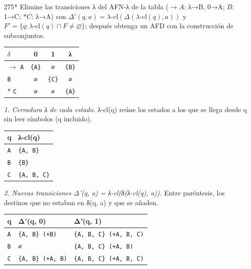 \documentclass[11pt]{article}
\begin{document}
\begin{ejercicio}{275}{*}
Elimine las transiciones λ del AFN-λ de la tabla ($\to A$: λ→{B}, 0→{A}; $B$: 1→{C}; $*C$: λ→{A}) con $\Delta'(q, a) = \lambda\text{-cl}(\Delta(\lambda\text{-cl}(q), a))$ y $F' = \{q : \lambda\text{-cl}(q) \cap F \ne \varnothing\}$; después obtenga un AFD con la construcción de subconjuntos.
\end{ejercicio}
\proc \begin{center}\small\begin{tabular}{lccc}\toprule
$\delta$ & 0 & 1 & λ \\\midrule
$\to$ \texttt{A} & \texttt{\{A\}} & \texttt{∅} & \texttt{\{B\}} \\
 \texttt{B} & \texttt{∅} & \texttt{\{C\}} & \texttt{∅} \\
$*$ \texttt{C} & \texttt{∅} & \texttt{∅} & \texttt{\{A\}} \\
\bottomrule\end{tabular}\end{center}
\textit{1. Cerradura λ de cada estado.} λ-cl(q) reúne los estados a los que se llega desde q sin leer símbolos (q incluido).
\begin{center}\footnotesize\begin{tabular}{ll}\toprule
q & λ-cl(q) \\\midrule
\texttt{A} & \texttt{\{A, B\}} \\
\texttt{B} & \texttt{\{B\}} \\
\texttt{C} & \texttt{\{A, B, C\}} \\
\bottomrule\end{tabular}\end{center}
\textit{2. Nuevas transiciones Δ'(q, a) = λ-cl(δ(λ-cl(q), a)).} Entre paréntesis, los destinos que no estaban en δ(q, a) y que se añaden.
\begin{center}\footnotesize\begin{tabular}{lll}\toprule
q & Δ'(q, 0) & Δ'(q, 1) \\\midrule
\texttt{A} & \texttt{\{A, B\}  (+B)} & \texttt{\{A, B, C\}  (+A, B, C)} \\
\texttt{B} & \texttt{∅} & \texttt{\{A, B, C\}  (+A, B)} \\
\texttt{C} & \texttt{\{A, B\}  (+A, B)} & \texttt{\{A, B, C\}  (+A, B, C)} \\
\bottomrule\end{tabular}\end{center}
\end{document}
